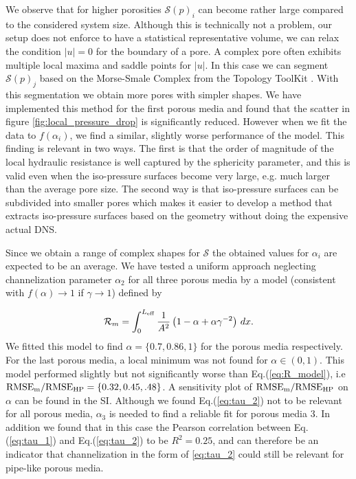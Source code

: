 \documentclass[draft]{agujournal2019}
\begin{document}
We observe that for higher porosities $\mathcal{S}(p)_i$ can become rather large compared to the considered system size. Although this is technically not a problem, our setup does not enforce to have a statistical representative volume, we can relax the condition $|u| = 0$ for the boundary of a pore. A complex pore often exhibits multiple local maxima and saddle points for $|u|$. In this case we can segment $\mathcal{S}(p)_j$ based on the Morse-Smale Complex from the Topology ToolKit \cite{tierny_topology_2018}. With this segmentation we obtain more pores with simpler shapes. We have implemented this method for the first porous media and found that the scatter in figure \ref{fig:local_pressure_drop} is significantly reduced. However when we fit the data to $f(\alpha_i)$, we find a similar, slightly worse performance of the model. This finding is relevant in two ways. The first is that the order of magnitude of the local hydraulic resistance is well captured by the sphericity parameter, and this is valid even when the iso-pressure surfaces become very large, e.g. much larger than the average pore size. The second way is that iso-pressure surfaces can be subdivided into smaller pores which makes it easier to develop a method that extracts iso-pressure surfaces based on the geometry without doing the expensive actual DNS.  

Since we obtain a range of complex shapes for $\mathcal{S}$ the obtained values for $\alpha_i$ are expected to be an average. We have tested a uniform approach neglecting channelization parameter $\alpha_2$ for all three porous media by a model (consistent with $f(\alpha)\rightarrow 1$ if $\gamma \rightarrow 1$) defined by 

\begin{equation}
	\mathcal{R}_m = \int^{L_{\rm{eff}}}_{0}\frac{1}{A^2}\left(1-\alpha + \alpha \gamma^{-2}\right)\,dx\label{eq:R_model_uniform}.
\end{equation}
We fitted this model to find $\alpha = \{0.7, 0.86, 1\}$ for the porous media respectively. For the last porous media, a local minimum was not found for $\alpha \in(0,1)$. This model performed slightly but not significantly worse than Eq.(\ref{eq:R_model}), i.e $\rm{RMSE}_m/\rm{RMSE}_{HP} = \{0.32, 0.45, .48\}$. A sensitivity plot of $\rm{RMSE}_m/\rm{RMSE}_{HP}$ on $\alpha$ can be found in the SI. Although we found Eq.(\ref{eq:tau_2}) not to be relevant for all porous media, $\alpha_3$ is needed to find a reliable fit for porous media 3. In addition we found that in this case the Pearson correlation between Eq.(\ref{eq:tau_1}) and Eq.(\ref{eq:tau_2}) to be $R^2= 0.25$, and can therefore be an indicator that channelization in the form of \ref{eq:tau_2} could still be relevant for pipe-like porous media. 
\end{document}
